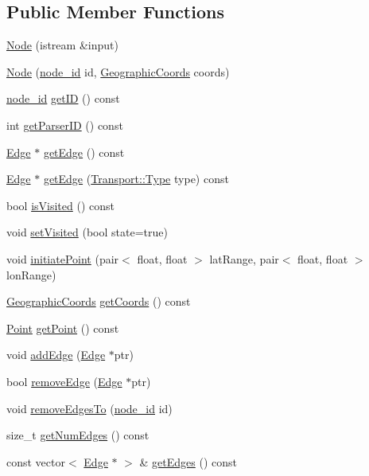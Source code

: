 \subsection*{Public Member Functions}
\begin{DoxyCompactItemize}
\item 
\hyperlink{class_node_a3662f8e557681586b8a44df334dbdfaa}{Node} (istream \&input)
\item 
\hyperlink{class_node_aceb6d58ed1ee8fe95c532453a1f09ad2}{Node} (\hyperlink{_node_8hpp_a9d6265804805c2375068fd7484840dc6}{node\+\_\+id} id, \hyperlink{class_geographic_coords}{Geographic\+Coords} coords)
\item 
\hyperlink{_node_8hpp_a9d6265804805c2375068fd7484840dc6}{node\+\_\+id} \hyperlink{class_node_a5e319f5c050c46590bed81fc4dc54325}{get\+ID} () const
\item 
int \hyperlink{class_node_ab79cb8588caac0a2d0dd99d7e7dd2f28}{get\+Parser\+ID} () const
\item 
\hyperlink{class_edge}{Edge} $\ast$ \hyperlink{class_node_a108b79d820efdc2768a148e9308b3c31}{get\+Edge} () const
\item 
\hyperlink{class_edge}{Edge} $\ast$ \hyperlink{class_node_aaf31a7f0f8e4dea82e48b1b09b89c217}{get\+Edge} (\hyperlink{class_transport_a1879cecfed0d4238e5a7af6d085db317}{Transport\+::\+Type} type) const
\item 
bool \hyperlink{class_node_a97dd8f95e09a0516f8939627f94bd58e}{is\+Visited} () const
\item 
void \hyperlink{class_node_a9d8e32dbc9c7a9e488b08f4fd1ce178f}{set\+Visited} (bool state=true)
\item 
void \hyperlink{class_node_a599f948564fa9f0cb358fe030161eb1e}{initiate\+Point} (pair$<$ float, float $>$ lat\+Range, pair$<$ float, float $>$ lon\+Range)
\item 
\hyperlink{class_geographic_coords}{Geographic\+Coords} \hyperlink{class_node_a77aeb1b8ddb7776e097f5ad8a56bd0d0}{get\+Coords} () const
\item 
\hyperlink{class_point}{Point} \hyperlink{class_node_a73562032360227efd9fe93d07ab2475f}{get\+Point} () const
\item 
void \hyperlink{class_node_a9c981148bc1602d4388c6ea6428450c4}{add\+Edge} (\hyperlink{class_edge}{Edge} $\ast$ptr)
\item 
bool \hyperlink{class_node_a4c78d9813537ccfc829401f979176428}{remove\+Edge} (\hyperlink{class_edge}{Edge} $\ast$ptr)
\item 
void \hyperlink{class_node_a70d6617e33b3fc219f9d3c1bd48d7cca}{remove\+Edges\+To} (\hyperlink{_node_8hpp_a9d6265804805c2375068fd7484840dc6}{node\+\_\+id} id)
\item 
size\+\_\+t \hyperlink{class_node_abc4a69053f8f664c9b6a6a6bbe5d8c68}{get\+Num\+Edges} () const
\item 
const vector$<$ \hyperlink{class_edge}{Edge} $\ast$ $>$ \& \hyperlink{class_node_a10a4e5c428f496080172680cb20ea9e0}{get\+Edges} () const
\end{DoxyCompactItemize}
